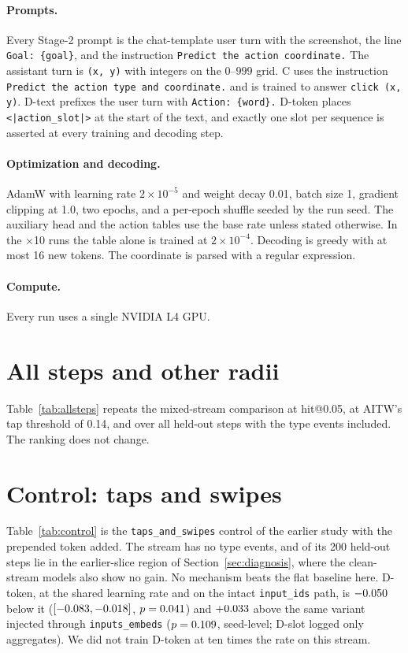 \documentclass[letterpaper]{article} %
\makeatletter
\newcommand{\hitat}[1]{hit@#1}
\newcommand{\mix}[1]{\texttt{#1}}
\makeatother
\begin{document}
\paragraph{Prompts.} Every Stage-2 prompt is the chat-template user turn with the screenshot, the line \texttt{Goal: \{goal\}}, and the instruction \texttt{Predict the action coordinate.} The assistant turn is \texttt{(x, y)} with integers on the $0$--$999$ grid. C uses the instruction \texttt{Predict the action type and coordinate.} and is trained to answer \texttt{click (x, y)}. D-text prefixes the user turn with \texttt{Action: \{word\}.} D-token places \texttt{<|action\_slot|>} at the start of the text, and exactly one slot per sequence is asserted at every training and decoding step.

\paragraph{Optimization and decoding.} AdamW with learning rate $2\times10^{-5}$ and weight decay 0.01, batch size 1, gradient clipping at 1.0, two epochs, and a per-epoch shuffle seeded by the run seed. The auxiliary head and the action tables use the base rate unless stated otherwise. In the $\times$10 runs the table alone is trained at $2\times10^{-4}$. Decoding is greedy with at most 16 new tokens. The coordinate is parsed with a regular expression.

\paragraph{Compute.} Every run uses a single NVIDIA L4 GPU.

\section{All steps and other radii}
\label{app:allsteps}
Table~\ref{tab:allsteps} repeats the mixed-stream comparison at \hitat{0.05}, at AITW's tap threshold of 0.14, and over all \nSliceN{} held-out steps with the type events included. The ranking does not change.



\section{Control: taps and swipes}
\label{app:control}
Table~\ref{tab:control} is the \mix{taps\_and\_swipes} control of the earlier study with the prepended token added. The stream has no type events, and \nCtlInSlice{} of its 200 held-out steps lie in the earlier-slice region of Section~\ref{sec:diagnosis}, where the clean-stream models also show no gain. No mechanism beats the flat baseline here. D-token, at the shared learning rate and on the intact \texttt{input\_ids} path, is $-0.050$ below it ($[-0.083, -0.018]$, $p = 0.041$) and $+0.033$ above the same variant injected through \texttt{inputs\_embeds} ($p = 0.109$, seed-level; D-slot logged only aggregates). We did not train D-token at ten times the rate on this stream.
\end{document}
